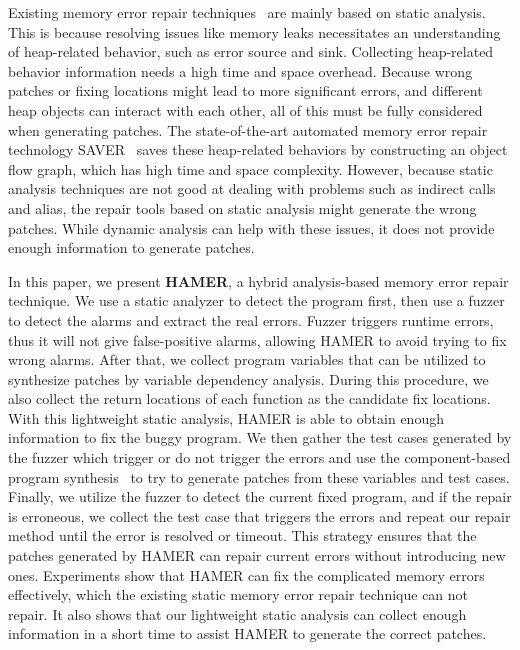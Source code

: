 \documentclass[a4paper,11pt,oneside,openany]{book}
\begin{document}
Existing memory error repair techniques~\cite{SAVER,Memfix} are mainly based on static analysis. This is because resolving issues like memory leaks necessitates an understanding of heap-related behavior, such as error source and sink. Collecting heap-related behavior information needs a high time and space overhead. Because wrong patches or fixing locations might lead to more significant errors, and different heap objects can interact with each other, all of this must be fully considered when generating patches. The state-of-the-art automated memory error repair technology SAVER~\cite{SAVER} saves these heap-related behaviors by constructing an object flow graph, which has high time and space complexity. However, because static analysis techniques are not good at dealing with problems such as indirect calls and alias, the repair tools based on static analysis might generate the wrong patches. While dynamic analysis can help with these issues, it does not provide enough information to generate patches.

In this paper, we present \textbf{HAMER}, a hybrid analysis-based memory error repair \mbox{technique}. We use a static analyzer to detect the program first, then use a fuzzer to detect the alarms and extract the real errors. Fuzzer triggers runtime errors, thus it will not give false-positive alarms, allowing HAMER to avoid trying to fix wrong alarms. After that, we collect program variables that can be utilized to synthesize patches by variable dependency analysis. During this procedure, we also collect the return locations of each function as the candidate fix locations. With this lightweight static analysis, HAMER is able to obtain enough information to fix the buggy program. We then gather the test cases generated by the fuzzer which trigger or do not trigger the errors and use the component-based program synthesis~\cite{oracle} to try to generate patches from these variables and test cases. Finally, we utilize the fuzzer to detect the current fixed program, and if the repair is erroneous, we collect the test case that triggers the errors and repeat our repair method until the error is resolved or timeout. This strategy ensures that the patches generated by HAMER can repair current errors without introducing new ones.  Experiments show that HAMER can fix the complicated memory errors effectively, which the existing static memory error repair technique can not repair. It also shows that our lightweight static analysis can collect enough information in a short time to assist HAMER to generate the correct patches.
\end{document}
